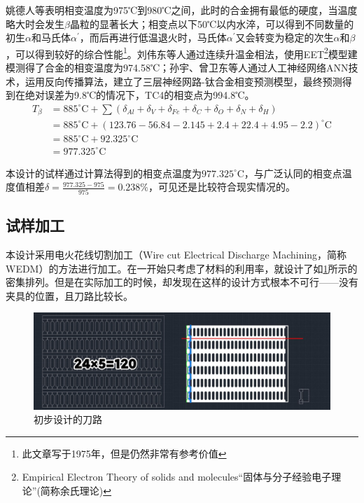 姚德人等\cite{yaoderenTc4taihejinxiangbiandiandeceding1975}表明相变温度为975℃到980℃之间，此时的合金拥有最低的硬度，当温度略大时会发生$\beta$晶粒的显著长大；相变点以下50℃以内水淬，可以得到不同数量的初生$ \alpha $和马氏体$ \alpha^{\prime} $，而后再进行低温退火时，马氏体$ \alpha^{\prime} $又会转变为稳定的次生$ \alpha$和$ \beta $，可以得到较好的综合性能\footnote{\color{red}此文章写于1975年，但是仍然非常有参考价值}。刘伟东等人\cite{liuweidongTC4hejinVzhuanbianwendudejinxiangfacedingyulilunjisuan2014}通过连续升温金相法，使用EET\footnote{Empirical Electron Theory of solids and molecules“固体与分子经验电子理论”(简称余氏理论)}模型建模测得了\ti 合金的相变温度为974.58℃；孙宇、曾卫东等人\cite{sunyuYingyongrengongshenjingwangluoyanjiuhuaxueyuansuduitaihejinxiangbiandiandeyingxiang2010}通过人工神经网络ANN技术，运用反向传播算法，建立了三层神经网路-钛合金相变预测模型，最终预测得到在绝对误差为9.8℃的情况下，TC4的相变点为994.8℃。
\begin{equation}
\begin{aligned}
T_\beta&=885^{\circ} \mathrm{C}+\sum (\delta_{Al}+\delta_{V}+\delta_{Fe}+\delta_{C}+\delta_{O}+\delta_{N}+\delta_{H})\\
&= 885^{\circ} \mathrm{C}+(123.76-56.84-2.145+2.4+22.4+4.95-2.2)^{\circ} \mathrm{C}\\
&=885^{\circ} \mathrm{C}+92.325^{\circ} \mathrm{C}\\
&=977.325^{\circ} \mathrm{C}
\end{aligned}
\end{equation}

本设计的试样通过计算法得到的相变点温度为$977.325^{\circ} \mathrm{C} $，与广泛认同的相变点温度值相差$\delta=\frac{977.325-975}{975}=0.238\% $，可见还是比较符合现实情况的。



\subsection{试样加工}
本设计采用电火花线切割加工（Wire cut Electrical Discharge Machining，简称WEDM）的方法进行加工。在一开始只考虑了材料的利用率，就设计了如\ref{fig:badway}所示的密集排列。但是在实际加工的时候，却发现在这样的设计方式根本不可行——没有夹具的位置，且刀路比较长。

\begin{figure}[h!]
	\centering
	\includegraphics[width=0.8\linewidth]{pic/刀路初步}
	\caption{初步设计的刀路}
	\label{fig:badway}
\end{figure}



